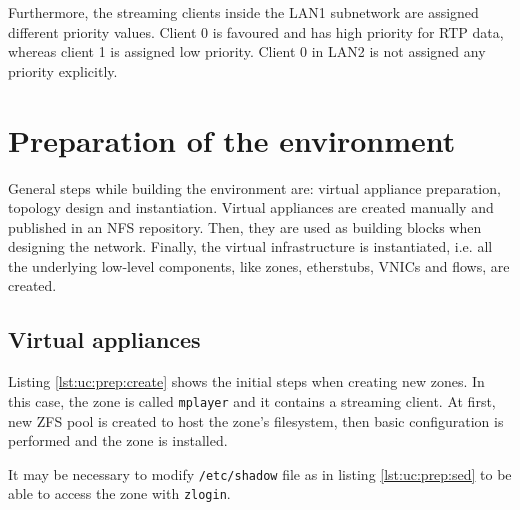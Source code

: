 \documentclass[11pt]{book}
\begin{document}
        Furthermore, the streaming clients inside the LAN1 subnetwork are assigned different priority values. Client 0 is
        favoured and has high priority for RTP data, whereas client 1 is assigned low priority. Client 0 in LAN2
        is not assigned any priority explicitly.


    \section{Preparation of the environment}
    \label{sec:uc:prep}

      General steps while building the environment are: virtual appliance preparation, topology design and
      instantiation. Virtual appliances are created manually and published in an NFS repository. Then, they are used as
      building blocks when designing the network. Finally, the virtual infrastructure is instantiated, i.e. all the
      underlying low-level components, like zones, etherstubs, VNICs and flows, are created.


      \subsection{Virtual appliances}
      \label{ssub:case:prep:va}

        Listing \ref{lst:uc:prep:create} shows the initial steps when creating new zones. In this case, the zone is
        called \texttt{mplayer} and it contains a streaming client. At first, new ZFS pool is created to host the zone's
        filesystem, then basic configuration is performed and the zone is installed. \\

        \noindent
        \begin{minipage}{\textwidth}
          
        \end{minipage}

        \noindent
        It may be necessary to modify \texttt{/etc/shadow} file as in listing \ref{lst:uc:prep:sed} to be able to access
        the zone with \texttt{zlogin}. \\

        \noindent
        \begin{minipage}{\textwidth}
          
        \end{minipage}
\end{document}
